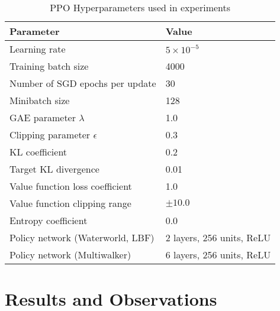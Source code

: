 \documentclass{article}
\begin{document}
\begin{table}[h]
    \centering
    \caption{PPO Hyperparameters used in experiments}
    \begin{tabular}{ll}
    \toprule
    \textbf{Parameter} & \textbf{Value} \\
    \midrule
    Learning rate & $5 \times 10^{-5}$ \\
    Training batch size & 4000 \\
    Number of SGD epochs per update & 30 \\
    Minibatch size & 128 \\
    GAE parameter $\lambda$ & 1.0 \\
    Clipping parameter $\epsilon$ & 0.3 \\
    KL coefficient & 0.2 \\
    Target KL divergence & 0.01 \\
    Value function loss coefficient & 1.0 \\
    Value function clipping range & $\pm 10.0$ \\
    Entropy coefficient & 0.0 \\
    Policy network (Waterworld, LBF) & 2 layers, 256 units, ReLU \\%
    Policy network (Multiwalker) & 6 layers, 256 units, ReLU \\%
    \bottomrule
    \end{tabular}
    \label{tab:ppo-hyperparams}
\end{table}

\FloatBarrier
\section{Results and Observations}




\end{document}
